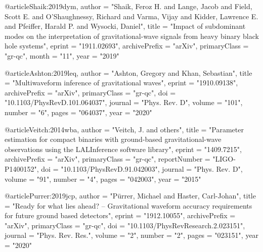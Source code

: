 @article{Shaik:2019dym,
    author = "Shaik, Feroz H. and Lange, Jacob and Field, Scott E. and O'Shaughnessy, Richard and Varma, Vijay and Kidder, Lawrence E. and Pfeiffer, Harald P. and Wysocki, Daniel",
    title = "{Impact of subdominant modes on the interpretation of gravitational-wave signals from heavy binary black hole systems}",
    eprint = "1911.02693",
    archivePrefix = "arXiv",
    primaryClass = "gr-qc",
    month = "11",
    year = "2019"
}

@article{Ashton:2019leq,
    author = "Ashton, Gregory and Khan, Sebastian",
    title = "{Multiwaveform inference of gravitational waves}",
    eprint = "1910.09138",
    archivePrefix = "arXiv",
    primaryClass = "gr-qc",
    doi = "10.1103/PhysRevD.101.064037",
    journal = "Phys. Rev. D",
    volume = "101",
    number = "6",
    pages = "064037",
    year = "2020"
}

@article{Veitch:2014wba,
    author = "Veitch, J. and others",
    title = "{Parameter estimation for compact binaries with ground-based gravitational-wave observations using the LALInference software library}",
    eprint = "1409.7215",
    archivePrefix = "arXiv",
    primaryClass = "gr-qc",
    reportNumber = "LIGO-P1400152",
    doi = "10.1103/PhysRevD.91.042003",
    journal = "Phys. Rev. D",
    volume = "91",
    number = "4",
    pages = "042003",
    year = "2015"
}

@article{Purrer:2019jcp,
    author = "Pürrer, Michael and Haster, Carl-Johan",
    title = "{Ready for what lies ahead? -- Gravitational waveform accuracy requirements for future ground based detectors}",
    eprint = "1912.10055",
    archivePrefix = "arXiv",
    primaryClass = "gr-qc",
    doi = "10.1103/PhysRevResearch.2.023151",
    journal = "Phys. Rev. Res.",
    volume = "2",
    number = "2",
    pages = "023151",
    year = "2020"
}